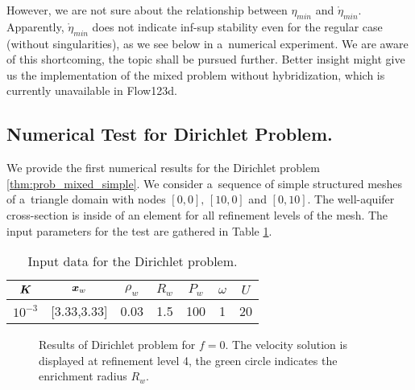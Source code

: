 However, we are not sure about the relationship between $\eta_{min}$ and $\mathring\eta_{min}$.
Apparently, $\mathring\eta_{min}$ does not indicate inf-sup stability even for the regular case (without singularities),
as we see below in a~numerical experiment.
We are aware of this shortcoming, the topic shall be pursued further. Better insight might give us the implementation
of the mixed problem without hybridization, which is currently unavailable in Flow123d.


\subsection{Numerical Test for Dirichlet Problem.}
We provide the first numerical results for the Dirichlet problem \ref{thm:prob_mixed_simple}.
We consider a~sequence of simple structured meshes of a~triangle domain with nodes $[0,0],\,[10,0]$ and $[0,10]$.
The well-aquifer cross-section is inside of an element for all refinement levels of the mesh.
The input parameters for the test are gathered in Table \ref{tab:test_case_10_data}.
%
\begin{table}[!hb]
\begin{center}
\begin{tabular}{ccccccc}
\toprule
$\mathbf{\boldsymbol{K}}$ & $\mathbf{\boldsymbol{x}}_w$  & $\rho_w$ & $R_w$ & $P_w$ & $\omega$ & $U$ \\
\midrule
$10^{-3}$ & {}[3.33,3.33] & 0.03 & 1.5 & 100 & 1 & 20\\
\bottomrule
\end{tabular}
\caption{Input data for the Dirichlet problem.}
\label{tab:test_case_10_data}
\end{center}
\end{table}
%
\begin{figure}[!htb]
    \centering
    \caption[Dirichlet problem results, zero source term.]
    {Results of Dirichlet problem for $f=0$. The velocity solution is displayed at refinement level 4,
    the green circle indicates the enrichment radius $R_w$.}
    \label{fig:mh_dirichlet_zero_source}
\end{figure}
%

